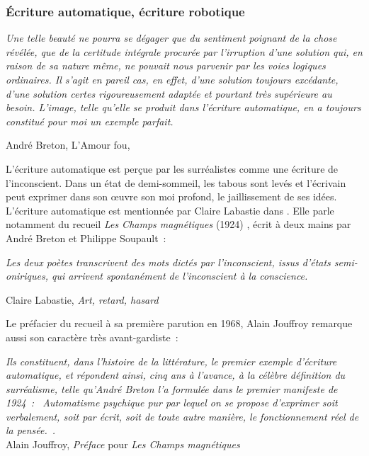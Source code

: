 \documentclass{article}
\newenvironment{citationbox}
{\begin{center}
		\begin{minipage}{.8\textwidth}
		}
		{
		\end{minipage}	
\end{center}
}
\begin{document}
			\subsubsection{\'{E}criture automatique, écriture robotique}\label{ecriture_auto}
				\begin{citationbox}
					\textit{Une telle beauté ne pourra se dégager que du sentiment poignant de la chose révélée, que de la certitude intégrale procurée par l'irruption d'une solution qui, en raison de sa nature même, ne pouvait nous parvenir par les voies logiques ordinaires. Il s'agit en pareil cas, en effet, d'une solution toujours excédante, d'une solution certes rigoureusement adaptée et pourtant très supérieure au besoin. L'image, telle qu'elle se produit dans l'écriture automatique, en a toujours constitué pour moi un exemple parfait.}
					\begin{flushright}
						André Breton, L'Amour fou, \autocite{breton1937}
					\end{flushright}
				\end{citationbox}
				L'écriture automatique est perçue par les surréalistes comme une écriture de l'inconscient. Dans un état de demi-sommeil, les tabous sont levés et l'écrivain peut exprimer dans son œuvre son moi profond, le jaillissement de ses idées. L'écriture automatique est mentionnée par Claire Labastie dans \autocite{labastie2016}. Elle parle notamment du recueil \textit{Les Champs magnétiques} (1924) \autocite{breton1937}, écrit à deux mains par André Breton et Philippe Soupault~:
				\begin{citationbox}
					\textit{Les deux poètes
					transcrivent des mots dictés par l'inconscient, issus d'états semi-oniriques, qui arrivent
					spontanément de l'inconscient à la conscience.}
					\begin{flushright}
						Claire Labastie, \textit{Art, retard, hasard}\autocite{labastie2016}
					\end{flushright}
				\end{citationbox}
				Le préfacier du recueil à sa première parution en 1968, Alain Jouffroy remarque aussi son caractère très avant-gardiste~:
				\begin{citationbox}
					\textit{Ils constituent, dans
					l’histoire de la littérature, le premier exemple d’écriture automatique, et
					répondent ainsi, cinq ans à l’avance, à la célèbre définition du
					surréalisme, telle qu’André Breton l’a formulée dans le premier
					manifeste de 1924~: \guillemotleft~Automatisme psychique pur par lequel on se
					propose d’exprimer soit verbalement, soit par écrit, soit de toute autre
					manière, le fonctionnement réel de la pensée.~\guillemotright.}\\
					Alain Jouffroy, \textit{Préface} pour \textit{Les Champs magnétiques}\autocite{breton1968}
				\end{citationbox}
				
\end{document}
